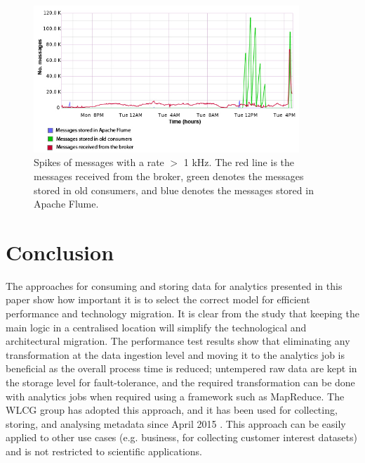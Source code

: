 \begin{figure}[H]
  \centering
  \includegraphics[width=100mm]{./Figures/flume_msg.jpg}
  \caption{\small Spikes of messages with a rate \( > \) 1 kHz. The red line is the messages received from the broker, green denotes the messages stored in old consumers, and blue denotes the messages stored in Apache Flume.}\label{fig:flum_stats}
\end{figure}


\section{Conclusion} \label{lbl-concl}
The approaches for consuming and storing data for analytics presented in this paper show how important it is to select the correct model for efficient performance and technology migration. It is clear from the study that keeping the main logic in a centralised location will simplify the technological and architectural migration. The performance test results show that eliminating any transformation at the data ingestion level and moving it to the analytics job is beneficial as the overall process time is reduced; untempered raw data are kept in the storage level for fault-tolerance, and the required transformation can be done with analytics jobs when required using a framework such as MapReduce. The WLCG group has adopted this approach, and it has been used for collecting, storing, and analysing metadata since April 2015 \cite{Magnoni20}. This approach can be easily applied to other use cases (e.g. business, for collecting customer interest datasets) and is not restricted to scientific applications.


%




